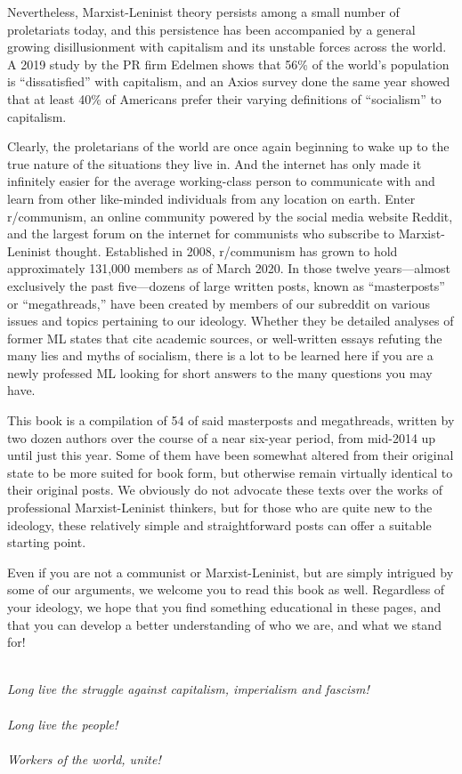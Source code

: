 Nevertheless, Marxist-Leninist theory persists among a small number of proletariats today, and this persistence has been accompanied by a general growing disillusionment with capitalism and its unstable forces across the world.
A 2019 study by the PR firm Edelmen shows that 56\% of the world's population is ``dissatisfied'' with capitalism, and an Axios survey done the same year showed that at least 40\% of Americans prefer their varying definitions of ``socialism'' to capitalism. 
 
Clearly, the proletarians of the world are once again beginning to wake up to the true nature of the situations they live in.
And the internet has only made it infinitely easier for the average working-class person to communicate with and learn from other like-minded individuals from any location on earth.
Enter r/communism, an online community powered by the social media website Reddit, and the largest forum on the internet for communists who subscribe to Marxist-Leninist thought.
Established in 2008, r/communism has grown to hold approximately 131,000 members as of March 2020.
In those twelve years---almost exclusively the past five---dozens of large written posts, known as ``masterposts'' or ``megathreads,'' have been created by members of our subreddit on various issues and topics pertaining to our ideology.
Whether they be detailed analyses of former ML states that cite academic sources, or well-written essays refuting the many lies and myths of socialism, there is a lot to be learned here if you are a newly professed ML looking for short answers to the many questions you may have. 
 
This book is a compilation of 54 of said masterposts and megathreads, written by two dozen authors over the course of a near six-year period, from mid-2014 up until just this year.
Some of them have been somewhat altered from their original state to be more suited for book form, but otherwise remain virtually identical to their original posts.
We obviously do not advocate these texts over the works of professional Marxist-Leninist thinkers, but for those who are quite new to the ideology, these relatively simple and straightforward posts can offer a suitable starting point. 
 
Even if you are not a communist or Marxist-Leninist, but are simply intrigued by some of our arguments, we welcome you to read this book as well. Regardless of your ideology, we hope that you find something educational in these pages, and that you can develop a better understanding of who we are, and what we stand for! 
\\\\
\begin{large}
\emph{Long live the struggle against capitalism, imperialism and fascism!}\\\\
\emph{Long live the people!}\\\\
\emph{Workers of the world, unite!}
\end{large}
